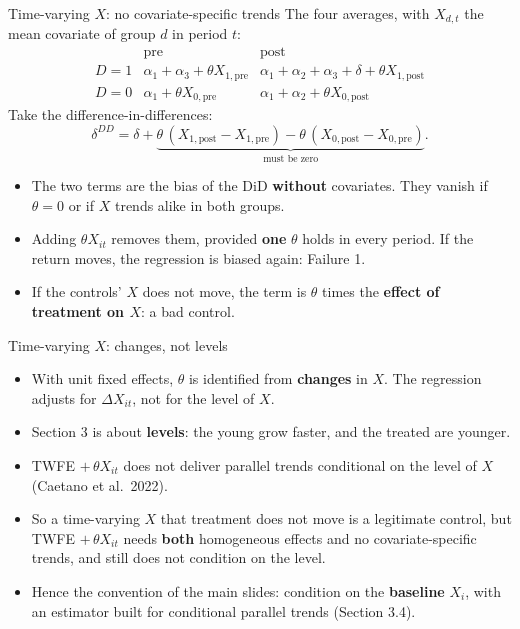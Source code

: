 \documentclass[
  11pt,
  ignorenonframetext,
  aspectratio=169,
]{beamer}
\providecommand{\tightlist}{%
  \setlength{\itemsep}{0pt}\setlength{\parskip}{0pt}}
\begin{document}
\begin{frame}{Time-varying \(X\): no covariate-specific trends}
\protect{}\label{time-varying-x-no-covariate-specific-trends}
The four averages, with \(X_{d,t}\) the mean covariate of group \(d\) in
period \(t\): \[
\begin{array}{lcc}
 & \text{pre} & \text{post} \\ \hline
D=1 & \alpha_1 + \alpha_3 + \theta X_{1,\text{pre}} & \alpha_1 + \alpha_2 + \alpha_3 + \delta + \theta X_{1,\text{post}} \\
D=0 & \alpha_1 + \theta X_{0,\text{pre}} & \alpha_1 + \alpha_2 + \theta X_{0,\text{post}}
\end{array}
\] Take the difference-in-differences: \[
\delta^{DD} = \delta + \underbrace{\theta\,(X_{1,\text{post}} - X_{1,\text{pre}}) - \theta\,(X_{0,\text{post}} - X_{0,\text{pre}})}_{\text{must be zero}} .
\]

\begin{itemize}
\tightlist
\item
  The two terms are the bias of the DiD \textbf{without} covariates.
  They vanish if \(\theta = 0\) or if \(X\) trends alike in both groups.
\item
  Adding \(\theta X_{it}\) removes them, provided \textbf{one}
  \(\theta\) holds in every period. If the return moves, the regression
  is biased again: Failure 1.
\item
  If the controls' \(X\) does not move, the term is \(\theta\) times the
  \textbf{effect of treatment on \(X\)}: a bad control.
\end{itemize}
\end{frame}

\begin{frame}{Time-varying \(X\): changes, not levels}
\protect{}\label{time-varying-x-changes-not-levels}
\begin{itemize}
\tightlist
\item
  With unit fixed effects, \(\theta\) is identified from
  \textbf{changes} in \(X\). The regression adjusts for
  \(\Delta X_{it}\), not for the level of \(X\).
\item
  Section 3 is about \textbf{levels}: the young grow faster, and the
  treated are younger.
\item
  TWFE \(+\,\theta X_{it}\) does not deliver parallel trends conditional
  on the level of \(X\) (Caetano et al.~2022).
\end{itemize}

\vspace{0.4em}

\begin{itemize}
\tightlist
\item
  So a time-varying \(X\) that treatment does not move is a legitimate
  control, but TWFE \(+\,\theta X_{it}\) needs \textbf{both} homogeneous
  effects and no covariate-specific trends, and still does not condition
  on the level.
\item
  Hence the convention of the main slides: condition on the
  \textbf{baseline} \(X_i\), with an estimator built for conditional
  parallel trends (Section 3.4).
\end{itemize}
\end{frame}
\end{document}
